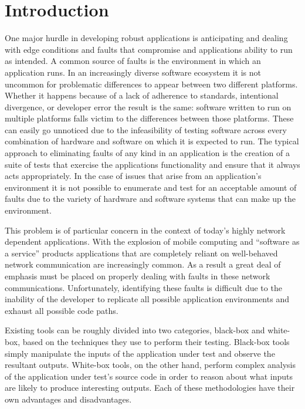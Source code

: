 \section{Introduction}

    One major hurdle in developing robust applications is anticipating and dealing with edge conditions and faults that
    compromise and applications ability to run as intended. A common source of faults is the environment in which an
    application runs. In an increasingly diverse software ecosystem it is not uncommon for problematic differences to
    appear between two different platforms. Whether it happens because of a lack of adherence to standards, intentional
    divergence, or developer error the result is the same: software written to run on multiple platforms falls victim to
    the differences between those platforms. These can easily go unnoticed due to the infeasibility of testing software
    across every combination of hardware and software on which it is expected to run. The typical approach to
    eliminating faults of any kind in an application is the creation of a suite of tests that exercise the applications
    functionality and ensure that it always acts appropriately. In the case of issues that arise from an application's
    environment it is not possible to enumerate and test for an acceptable amount of faults due to the variety of
    hardware and software systems that can make up the environment.

    This problem is of particular concern in the context of today's highly network dependent applications. With the
    explosion of mobile computing and ``software as a service'' products applications that are completely reliant on
    well-behaved network communication are increasingly common. As a result a great deal of emphasis must be placed on
    properly dealing with faults in these network communications. Unfortunately, identifying these faults is difficult
    due to the inability of the developer to replicate all possible application environments and exhaust all possible
    code paths.

    Existing tools can be roughly divided into two categories, black-box and white-box, based on the techniques they use
    to perform their testing. Black-box tools simply manipulate the inputs of the application under test and observe the
    resultant outputs. White-box tools, on the other hand, perform complex analysis of the application under test's
    source code in order to reason about what inputs are likely to produce interesting outputs. Each of these
    methodologies have their own advantages and disadvantages.

